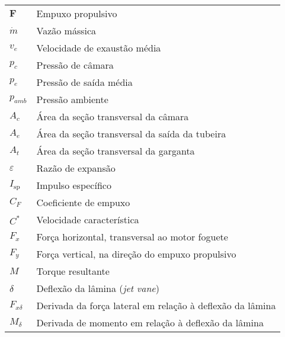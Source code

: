 \begin{longtable}{ll}
\(\mathbf{F}\) & Empuxo propulsivo \\
\(\dot{m}\) & Vazão mássica \\
\(v_e\) & Velocidade de exaustão média \\
\(p_c\) & Pressão de câmara \\
\(p_e\) & Pressão de saída média \\
\(p_{amb}\) & Pressão ambiente \\
\(A_c\) & Área da seção transversal da câmara \\
\(A_e\) & Área da seção transversal da saída da tubeira \\
\(A_t\) & Área da seção transversal da garganta \\
\(\varepsilon \) & Razão de expansão \\
\(I_{\mathrm{sp}}\) & Impulso específico \\
\(C_F\) & Coeficiente de empuxo \\
\(C^*\) & Velocidade característica \\
\(F_x\) & Força horizontal, transversal ao motor foguete \\
\(F_y\) & Força vertical, na direção do empuxo propulsivo \\
\(M\) & Torque resultante \\
\(\delta \) & Deflexão da lâmina (\textit{jet vane}) \\
\(F_{x\delta}\) & Derivada da força lateral em relação à deflexão da lâmina \\
\(M_\delta \) & Derivada de momento em relação à deflexão da lâmina
\end{longtable}

